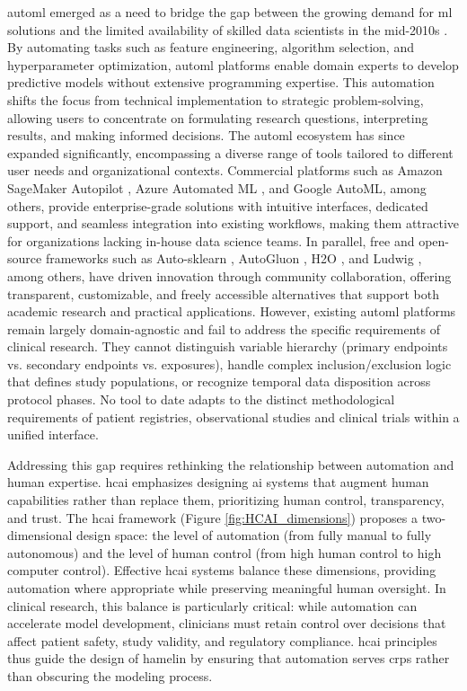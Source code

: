 \documentclass[conference,onecolumn]{IEEEtran}
\begin{document}
\gls{automl} emerged as a need to bridge the gap between the growing demand for \gls{ml} solutions and the limited availability of skilled data scientists in the mid-2010s \cite{he2021automl}. By automating tasks such as feature engineering, algorithm selection, and hyperparameter optimization, \gls{automl} platforms enable domain experts to develop predictive models without extensive programming expertise. This automation shifts the focus from technical implementation to strategic problem-solving, allowing users to concentrate on formulating research questions, interpreting results, and making informed decisions. The \gls{automl} ecosystem has since expanded significantly, encompassing a diverse range of tools tailored to different user needs and organizational contexts. Commercial platforms such as Amazon SageMaker Autopilot \cite{AmazonSagemakerAutopilot}, Azure Automated ML \cite{AzureAutomatedML}, and Google AutoML\cite{GoogleAutoML}, among others, provide enterprise-grade solutions with intuitive interfaces, dedicated support, and seamless integration into existing workflows, making them attractive for organizations lacking in-house data science teams. In parallel, free and open-source frameworks such as Auto-sklearn \cite{autosklearn}, AutoGluon \cite{autogluon}, H2O \cite{h2o3}, and Ludwig \cite{ludwig}, among others, have driven innovation through community collaboration, offering transparent, customizable, and freely accessible alternatives that support both academic research and practical applications. However, existing \gls{automl} platforms remain largely domain-agnostic and fail to address the specific requirements of clinical research. They cannot distinguish variable hierarchy (primary endpoints vs. secondary endpoints vs. exposures), handle complex inclusion/exclusion logic that defines study populations, or recognize temporal data disposition across protocol phases. No tool to date adapts to the distinct methodological requirements of patient registries, observational studies and clinical trials within a unified interface.

Addressing this gap requires rethinking the relationship between automation and human expertise. \Gls{hcai} \cite{shneiderman2022human} emphasizes designing \gls{ai} systems that augment human capabilities rather than replace them, prioritizing human control, transparency, and trust. The \gls{hcai} framework (Figure \ref{fig:HCAI_dimensions}) proposes a two-dimensional design space: the level of automation (from fully manual to fully autonomous) and the level of human control (from high human control to high computer control). Effective \gls{hcai} systems balance these dimensions, providing automation where appropriate while preserving meaningful human oversight. In clinical research, this balance is particularly critical: while automation can accelerate model development, clinicians must retain control over decisions that affect patient safety, study validity, and regulatory compliance. \gls{hcai} principles thus guide the design of \gls{hamelin} by ensuring that automation serves \glspl{crp} rather than obscuring the modeling process.
\end{document}
